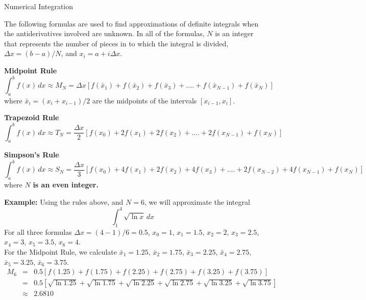 \documentclass[11pt]{article}
\begin{document}
\begin{center}
\Large
\rm{Numerical Integration}
\end{center}
\vspace{0.05in}

The following formulas are used to find approximations of definite integrals when the antiderivatives involved are unknown.
In all of the formulas, $N$ is an integer that represents the number of pieces in to which the integral is divided, $\Delta x = (b-a)/N$, 
and $x_i = a+i\Delta x$. 

\vspace{0.5cm}

{\bf Midpoint Rule}
\begin{displaymath}
\int_a^bf(x)\,dx \approx M_N = \Delta x\left[f(\bar{x}_1) + f(\bar{x}_2) + f(\bar{x}_3) + .... + f(\bar{x}_{N-1}) + f(\bar{x}_N)\right]
\end{displaymath}
where $\bar{x}_i = (x_i+x_{i-1})/2$ are the midpoints of the intervals $[x_{i-1},x_i]$.

\vspace{0.5cm}

{\bf Trapezoid Rule}
\begin{displaymath}
\int_a^bf(x)\,dx \approx T_N = \frac{\Delta x}{2}\left[f(x_0) + 2f(x_1) + 2f(x_2) + .... + 2f(x_{N-1}) + f(x_N)\right]
\end{displaymath}

\vspace{0.5cm}

{\bf Simpson's Rule}
\begin{displaymath}
\int_a^bf(x)\,dx \approx S_N = \frac{\Delta x}{3}\left[f(x_0) + 4f(x_1) + 2f(x_2) +  4f(x_3) + .... + 2f(x_{N-2}) + 4f(x_{N-1}) + f(x_N)\right]
\end{displaymath}
where $N$ {\bf is an even integer.}

\vspace{0.5cm}

{\bf Example:}
Using the rules above, and $N=6$, we will approximate the integral 
\begin{displaymath}
\int_1^4\sqrt{\ln{x}}\,dx 
\end{displaymath}
For all three formulas $\Delta x = (4-1)/6 = 0.5$, $x_0=1$, $x_1=1.5$, $x_2=2$, $x_3=2.5$, $x_4=3$, $x_5=3.5$, $x_6=4$.  
\\
For the Midpoint Rule, we calculate $\bar{x}_1=1.25$, $\bar{x}_2=1.75$, $\bar{x}_3=2.25$, $\bar{x}_4=2.75$, $\bar{x}_5=3.25$, $\bar{x}_6=3.75$. 
\begin{eqnarray*}
M_6 &=& 0.5\left[f(1.25) + f(1.75) + f(2.25) + f(2.75) + f(3.25) + f(3.75)\right] \\
    &=& 0.5\left[\sqrt{\ln{1.25}} + \sqrt{\ln{1.75}} + \sqrt{\ln{2.25}} + \sqrt{\ln{2.75}} + \sqrt{\ln{3.25}} + \sqrt{\ln{3.75}}\right] \\
    &\approx & 2.6810
\end{eqnarray*}
\end{document}
